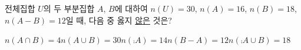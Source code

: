 전체집합 $U$의 두 부분집합 $A$, $B$에 대하여 $n(U)=30$, $n(A)=16$, $n(B)=18$, $n(A-B)=12$일 때, 다음 중 옳지 \underline{않은} 것은?
\begin{choicesii}{$n(A\cap B)=4$}{$n(A\cup B)=30$}{$n(\comp{A})=14$}{$n(B-A)=12$}{$n(\comp{A}\cup B)=18$}\end{choicesii}
